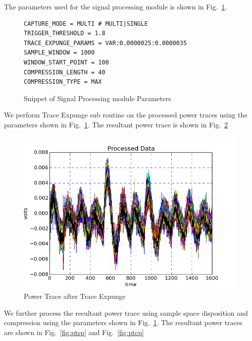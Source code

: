 \documentclass{llncs}
\numberwithin{algorithm}{chapter}
\begin{document}
The parameters used for the signal processing module is shown in Fig.~\ref{fig:fobos:paramsa}.

\begin{figure}[H]
\begin{Verbatim}[frame=single]
CAPTURE_MODE = MULTI # MULTI|SINGLE
TRIGGER_THRESHOLD = 1.8
TRACE_EXPUNGE_PARAMS = VAR:0.0000025:0.0000035
SAMPLE_WINDOW = 1000
WINDOW_START_POINT = 100
COMPRESSION_LENGTH = 40
COMPRESSION_TYPE = MAX
\end{Verbatim}
\caption{\label{fig:fobos:paramsa}Snippet of Signal Processing module Parameters}
\end{figure}


We perform Trace Expunge sub routine on the processed power traces
using the parameters shown in Fig.~\ref{fig:fobos:paramsa}. The resultant power trace is
shown in Fig.~\ref{fig:pttx}

\begin{figure}[H]
\begin{center}
\includegraphics[scale=0.8]{figures/scaTrace2}
\caption{\label{fig:pttx}Power Trace after Trace Expunge}
\end{center} 
\vspace{-3ex}
\end{figure}

We further process the resultant power trace using sample space disposition and compression
using the parameters shown in Fig.~\ref{fig:fobos:paramsa}.
 The resultant
power traces are shown in Fig.~\ref{fig:ptsp} and Fig.~\ref{fig:ptcp}
\end{document}
